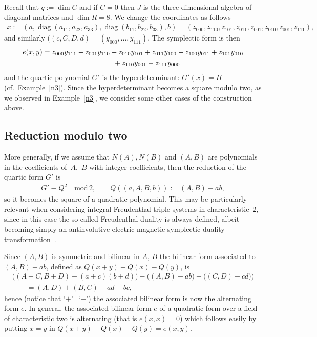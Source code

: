 \documentclass[10pt,a4paper]{amsart}
\numberwithin{equation}{section}
\begin{document}
\begin{Example}[$q=0$] \label{q=0}
Recall that $q:=\dim C$ and if $C=0$ then $J$ is the three-dimensional algebra of diagonal matrices and $\dim R=8$. We change the coordinates as follows
\begin{gather*}
x:= (a,\operatorname{diag}(a_{11},a_{22},a_{33}),\operatorname{diag}(b_{11},b_{22},b_{33}),b) =(z_{000},z_{110},z_{101},z_{011},z_{001},z_{010},z_{001},z_{111}),
\end{gather*}
and similarly $((c,C,D,d)=(y_{000},\ldots,y_{111})$. The symplectic form is then
\begin{gather*}
e(x,y) =z_{000} y_{111} - z_{001} y_{110} - z_{010} y_{101} + z_{011} y_{100} - z_{100} y_{011} + z_{101} y_{010} \\
\hphantom{e(x,y) =}{}+ z_{110} y_{001} - z_{111} y_{000}
\end{gather*}
and the quartic polynomial $G'$ is the hyperdeterminant: $G'(x)=H$ (cf.\ Example~\ref{n3}). Since the hyperdeterminant becomes a square modulo two, as we observed in Example~\ref{n3}, we consider some other cases of the construction above.
\end{Example}

\subsection{Reduction modulo two}
More generally, if we assume that $N(A),N(B)$ and $(A,B)$ are polynomials in the coefficients of~$A$,~$B$ with integer coefficients, then the reduction of the quartic form $G'$ is
\begin{gather*}
G'\equiv Q^2\quad\text{mod}\, 2,\qquad Q((a,A,B,b)) := (A,B)-ab,
\end{gather*}
so it becomes the square of a quadratic polynomial. This may be particularly relevant when considering integral Freudenthal triple systems in characteristic~2, since in this case the so-called Freudenthal duality is always defined, albeit becoming simply an antinvolutive electric-magnetic symplectic duality transformation~\cite{BDDR,FKM}.

Since $(A,B)$ is symmetric and bilinear in $A$, $B$ the bilinear form associated to $(A,B)-ab$, defined as $Q(x+y)-Q(x)-Q(y)$, is
\begin{gather*}
\big((A+C,B+D)-(a+c)(b+d)\big) - \big((A,B)-ab\big) - \big((C,D)-cd)\big)\\
\qquad{} = (A,D) + (B,C) - ad - bc,
\end{gather*}
hence (notice that `$+$'=`$-$') the associated bilinear form is now the alternating form $e$. In general, the associated bilinear form $e$ of a quadratic form over a field of
characteristic two is alternating (that is $e(x,x)=0$) which follows easily by putting $x=y$ in $Q(x+y)-Q(x)-Q(y)=e(x,y)$.
\end{document}

